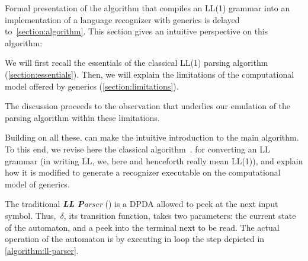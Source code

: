 Formal presentation of the algorithm that compiles an LL(1) grammar into an implementation of a
  language recognizer with \Java generics
  is delayed to~\cref{section:algorithm}.
This section gives an intuitive perspective on this algorithm:

We will first recall the essentials of the classical LL(1) parsing algorithm (\cref{section:essentials}).
Then, we will explain the limitations of the computational model
  offered by \Java generics (\cref{section:limitations}).

The discussion proceeds to the observation
  that underlies our emulation of the parsing algorithm
  within these limitations.

Building on all these,  can
  make the intuitive introduction to the main algorithm.
To this end, we revise here the classical algorithm~\cite{Lewis:66}. 
for converting an LL grammar (in writing LL, we, here and henceforth really mean LL(1)),
  and explain
  how it is modified to generate a recognizer executable
  on the computational model of \Java generics.

\label{section:essentials}
The traditional \emph{\textbf{LL} \textbf Parser} (\LLp)
  is a DPDA allowed to peek at the next input symbol.
Thus,~$δ$, its transition function, takes two parameters: the current
  state of the automaton, and a peek into the terminal next to be read.
The actual operation of the automaton is by executing in loop the step
  depicted in \cref{algorithm:ll-parser}.

